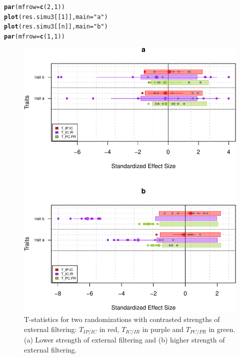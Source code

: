 \documentclass[12pt]{article}\usepackage[]{graphicx}\usepackage[]{color}
\makeatletter
\def\maxwidth{ %
  \ifdim\Gin@nat@width>\linewidth
    \linewidth
  \else
    \Gin@nat@width
  \fi
}
\newcommand{\hlnum}[1]{\textcolor[rgb]{0.686,0.059,0.569}{#1}}%
\newcommand{\hlstr}[1]{\textcolor[rgb]{0.192,0.494,0.8}{#1}}%
\newcommand{\hlstd}[1]{\textcolor[rgb]{0.345,0.345,0.345}{#1}}%
\newcommand{\hlkwc}[1]{\textcolor[rgb]{0.333,0.667,0.333}{#1}}%
\newcommand{\hlkwd}[1]{\textcolor[rgb]{0.737,0.353,0.396}{\textbf{#1}}}%
\newenvironment{kframe}{%
 \def\at@end@of@kframe{}%
 \ifinner\ifhmode%
  \def\at@end@of@kframe{\end{minipage}}%
  \begin{minipage}{\columnwidth}%
 \fi\fi%
 \def\FrameCommand##1{\hskip\@totalleftmargin \hskip-\fboxsep
 \colorbox{shadecolor}{##1}\hskip-\fboxsep
     \hskip-\linewidth \hskip-\@totalleftmargin \hskip\columnwidth}%
 \MakeFramed {\advance\hsize-\width
   \@totalleftmargin\z@ \linewidth\hsize
   \@setminipage}}%
 {\par\unskip\endMakeFramed%
 \at@end@of@kframe}
\newenvironment{knitrout}{}{} %
\makeatother
\begin{document}
\begin{knitrout}\small
{}\color{fgcolor}\begin{kframe}
\begin{alltt}
\hlkwd{par}\hlstd{(}\hlkwc{mfrow}\hlstd{=}\hlkwd{c}\hlstd{(}\hlnum{2}\hlstd{,} \hlnum{1}\hlstd{))}
\hlkwd{plot}\hlstd{(res.simu3[[}\hlnum{1}\hlstd{]],} \hlkwc{main} \hlstd{=} \hlstr{"a"}\hlstd{)}
\hlkwd{plot}\hlstd{(res.simu3[[n]],} \hlkwc{main} \hlstd{=} \hlstr{"b"}\hlstd{)}
\hlkwd{par}\hlstd{(}\hlkwc{mfrow}\hlstd{=}\hlkwd{c}\hlstd{(}\hlnum{1}\hlstd{,} \hlnum{1}\hlstd{))}
\end{alltt}
\end{kframe}\begin{figure}

{\centering \includegraphics[width=\maxwidth]{figure/typical_results_external_filtering2-1} 

}

\caption[T-statistics for two randomizations with contrasted strengths of external filtering]{T-statistics for two randomizations with contrasted strengths of external filtering: $T_{IP/IC}$ in red, $T_{IC/IR}$ in purple and $T_{PC/PR}$ in green. (a) Lower strength of external filtering and (b) higher strength of external filtering.}\label{fig:typical_results_external_filtering2}
\end{figure}


\end{knitrout}
\end{document}
